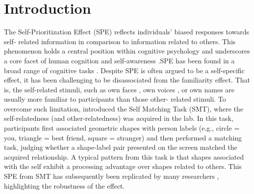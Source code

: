 \documentclass[sn-apa]{sn-jnl}%
\theoremstyle{thmstyleone}%
\theoremstyle{thmstyletwo}%
\theoremstyle{thmstylethree}%
\begin{document}
\maketitle

\section{Introduction}\label{sec:intro}

The Self-Prioritization Effect (SPE) reflects individuals’ biased responses towards self- related information in comparison to information related to others. This phenomenon holds a central position within cognitive psychology and underscores a core facet of human cognition and self-awareness \parencite{sui2017the}.SPE has been found in a broad range of cognitive tasks \parencite[e.g.,][]{sui2012perceptual,cunningham2008yours, rogers1977self}. Despite SPE is often argued to be a self-specific effect, it has been challenging to be disassociated from the familiarity effect. That is, the self-related stimuli, such as own faces \parencite{keenan2000self,kircher2000towards,turk2002mike}, own voices \parencite{hughes2013i,payne2021perceptual}, or own names \parencite{constable2019it} are usually more familiar to participants than those other- related stimuli. To overcome such limitation, \textcite{sui2012perceptual} introduced the Self Matching Task (SMT), where the self-relatedness (and other-relatedness) was acquired in the lab. In this task, participants first associated geometric shapes with person labels (e.g., circle = you, triangle = best friend, square = stranger) and then performed a matching task, judging whether a shape-label pair presented on the screen matched the acquired relationship. A typical pattern from this task is that shapes associated with the self exhibit a processing advantage over shapes related to others. This SPE from SMT has subsequently been replicated by many researchers \parencite{constable2019relevant,golubickis2020parts,golubickis2017self,hu2020good}, highlighting the robustness of the effect. 
\end{document}
